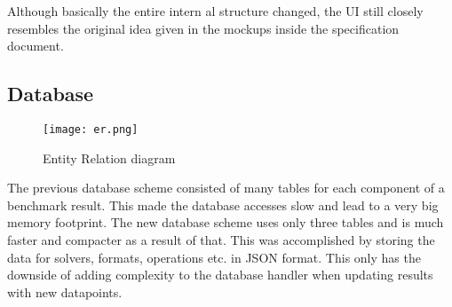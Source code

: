 Although basically the entire intern al structure changed, the UI still closely resembles the original idea given in the mockups inside the specification document.


\subsection{Database}

\begin{figure}[H]
	\centering
	\texttt{[image: er.png]}
	\caption{Entity Relation diagram}
  \label{fig:er}
\end{figure}

The previous database scheme consisted of many tables for each component of a benchmark result. This made the database accesses slow and lead to a very big memory footprint. The new database scheme uses only three tables and is much faster and compacter as a result of that. This was accomplished by storing the data for solvers, formats, operations etc. in JSON format. This only has the downside of adding complexity to the database handler when updating results with new datapoints.
